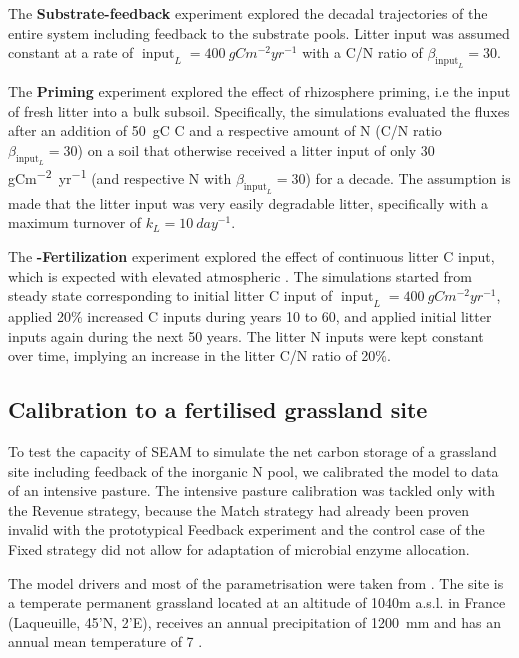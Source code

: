 The \textbf{Substrate-feedback} experiment explored the decadal trajectories
of the entire system including feedback to the substrate pools. Litter input was
assumed constant at a rate of $\operatorname{input}_L = 400~\unit{gCm^{-2}yr^{-1}}$
with a C/N ratio of $\beta_{\operatorname{input}_L} = 30$.

The \textbf{Priming} experiment explored the effect of rhizosphere priming, i.e
the input of fresh litter into a bulk subsoil. Specifically, the simulations
evaluated the fluxes after an addition of 50~\unit{gC} C and a respective amount
of N (C/N ratio $\beta_{\operatorname{input}_L} = 30$) on a soil that otherwise
received a litter input of only 30 \unit{gCm^{-2}yr^{-1}} (and respective N with
$\beta_{\operatorname{input}_L} = 30$) for a decade. The assumption is made that
the litter input was very easily degradable litter, specifically with a maximum
turnover of $k_L = 10~\unit{day^{-1}}$.

The \textbf{-Fertilization} experiment explored the effect of
continuous  litter C input, which is expected with elevated atmospheric
.
The simulations started from steady state corresponding to initial litter C
input of $\operatorname{input}_L = 400~\unit{gCm^{-2}yr^{-1}}$, applied 20\%
increased C inputs during years 10 to 60, and applied initial litter inputs
again during the next 50 years. The litter N inputs were kept constant over
time, implying an increase in the litter C/N ratio of 20\%.

\subsection{Calibration to a fertilised grassland site}
\label{sec:methodsPasture}

To test the capacity of SEAM to simulate the net carbon storage of a
grassland site including feedback of the inorganic N pool, we calibrated the
model to data of an intensive pasture. The intensive
pasture calibration was tackled only with the Revenue strategy, because the
Match strategy had already been proven invalid with the prototypical Feedback
experiment and the control case of the Fixed strategy did not allow for adaptation
of microbial enzyme allocation.

The model drivers and most of the parametrisation were taken
from \citet{Perveen14}. The site is a temperate permanent grassland located at
an altitude of 1040m a.s.l. in France (Laqueuille, 45'N,
2'E), receives an annual precipitation of 1200~mm and has an
annual mean temperature of  7 .

